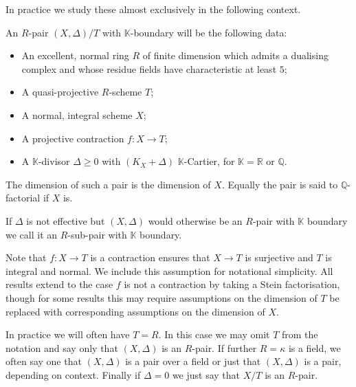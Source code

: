 In practice we study these almost exclusively in the following context.

\begin{definition}\label{setup}
	An $R$-pair $(X,\Delta)/ T$ with $\mathbb{K}$-boundary will be the following data:
	\begin{itemize}
		\item An excellent, normal ring $R$ of finite dimension which admits a dualising complex and whose residue fields have characteristic at least $5$;
		\item A quasi-projective $R$-scheme $T$;
		\item A normal, integral scheme $X$;
		\item A projective contraction $f \colon X \to T$;
		\item A $\mathbb{K}$-divisor $\Delta \geq 0$ with $(K_{X}+\Delta)$ $\mathbb{K}$-Cartier, for $\mathbb{K}=\mathbb{R}$ or $\mathbb{Q}$.
	\end{itemize}
	
	The dimension of such a pair is the dimension of $X$. Equally the pair is said to $\mathbb{Q}$-factorial if $X$ is.
	
	If $\Delta$ is not effective but $(X,\Delta)$ would otherwise be an $R$-pair with $\mathbb{K}$ boundary we call it an $R$-sub-pair with $\mathbb{K}$ boundary.
\end{definition}

Note that $f \colon X \to T$ is a contraction ensures that $X \to T$ is surjective and $T$ is integral and normal. We include this assumption for notational simplicity. All results extend to the case $f$ is not a contraction by taking a Stein factorisation, though for some results this may require assumptions on the dimension of $T$ be replaced with corresponding assumptions on the dimension of $X$. 


%	

In practice we will often have $T=R$. In this case we may omit $T$ from the notation and say only that $(X,\Delta)$ is an $R$-pair. If further $R=\kappa$ is a field, we often say one that $(X,\Delta)$ is a pair over a field or just that $(X,\Delta)$ is a pair, depending on context. Finally if $\Delta=0$ we just say that $X/T$ is an $R$-pair.

